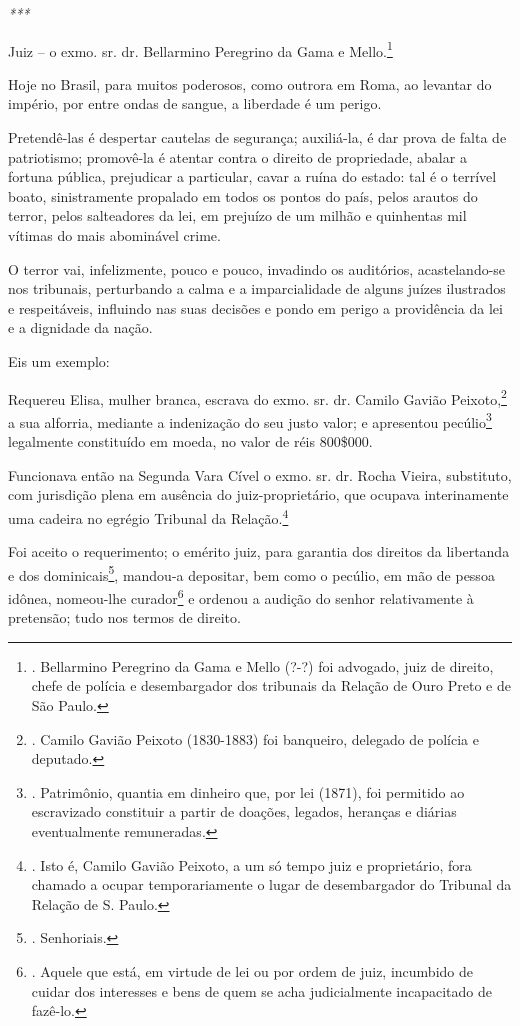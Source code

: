 \emph{***}

Juiz -- o exmo. sr. dr. Bellarmino Peregrino da Gama e Mello.\footnote{.
  Bellarmino Peregrino da Gama e Mello (?-?) foi advogado, juiz de
  direito, chefe de polícia e desembargador dos tribunais da Relação de
  Ouro Preto e de São Paulo.}

Hoje no Brasil, para muitos poderosos, como outrora em Roma, ao levantar
do império, por entre ondas de sangue, a liberdade é um perigo.

Pretendê-las é despertar cautelas de segurança; auxiliá-la, é dar prova
de falta de patriotismo; promovê-la é atentar contra o direito de
propriedade, abalar a fortuna pública, prejudicar a particular, cavar a
ruína do estado: tal é o terrível boato, sinistramente propalado em
todos os pontos do país, pelos arautos do terror, pelos salteadores da
lei, em prejuízo de um milhão e quinhentas mil vítimas do mais
abominável crime.

O terror vai, infelizmente, pouco e pouco, invadindo os auditórios,
acastelando-se nos tribunais, perturbando a calma e a imparcialidade de
alguns juízes ilustrados e respeitáveis, influindo nas suas decisões e
pondo em perigo a providência da lei e a dignidade da nação.

Eis um exemplo:

Requereu Elisa, mulher branca, escrava do exmo. sr. dr. Camilo Gavião
Peixoto,\footnote{. Camilo Gavião Peixoto (1830-1883) foi banqueiro,
  delegado de polícia e deputado.} a sua alforria, mediante a
indenização do seu justo valor; e apresentou pecúlio\footnote{.
  Patrimônio, quantia em dinheiro que, por lei (1871), foi permitido ao
  escravizado constituir a partir de doações, legados, heranças e
  diárias eventualmente remuneradas.} legalmente constituído em moeda,
no valor de réis 800\$000.

Funcionava então na Segunda Vara Cível o exmo. sr. dr. Rocha Vieira,
substituto, com jurisdição plena em ausência do juiz-proprietário, que
ocupava interinamente uma cadeira no egrégio Tribunal da
Relação.\footnote{. Isto é, Camilo Gavião Peixoto, a um só tempo juiz e
  proprietário, fora chamado a ocupar temporariamente o lugar de
  desembargador do Tribunal da Relação de S. Paulo.}

Foi aceito o requerimento; o emérito juiz, para garantia dos direitos da
libertanda e dos dominicais\footnote{. Senhoriais.}, mandou-a depositar,
bem como o pecúlio, em mão de pessoa idônea, nomeou-lhe
curador\footnote{. Aquele que está, em virtude de lei ou por ordem de
  juiz, incumbido de cuidar dos interesses e bens de quem se acha
  judicialmente incapacitado de fazê-lo.} e ordenou a audição do senhor
relativamente à pretensão; tudo nos termos de direito.

